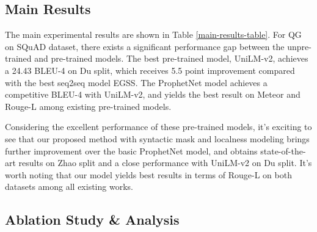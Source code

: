 \documentclass[11pt]{article}
\begin{document}
\subsection{Main Results}

The main experimental results are shown in Table \ref{main-results-table}. For QG on SQuAD dataset, there exists a significant performance gap between the unpre-trained and pre-trained models. The best pre-trained model, UniLM-v2, achieves a 24.43 BLEU-4 on Du split, which receives 5.5 point improvement compared with the best seq2seq model EGSS. The ProphetNet model achieves a competitive BLEU-4 with UniLM-v2, and yields the best result on Meteor and Rouge-L among existing pre-trained models. 




Considering the excellent performance of these pre-trained models, it's exciting to see that our proposed method with syntactic mask and localness modeling brings further improvement over the basic ProphetNet model, and obtains state-of-the-art results on Zhao split and a close performance with UniLM-v2 on Du split. It's worth noting that our model yields best results in terms of Rouge-L on both datasets among all existing works. 

\subsection{Ablation Study \& Analysis}
\end{document}
